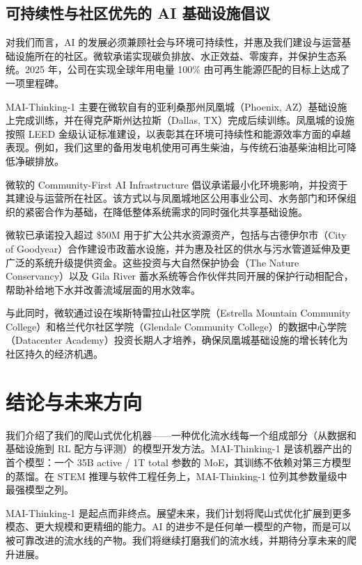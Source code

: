 \documentclass[
  10
]{article}
\begin{document}
\subsection{可持续性与社区优先的 AI 基础设施倡议}\label{sustainability-and-communityfirst-ai-infrastructure-initiatives}

对我们而言，AI 的发展必须兼顾社会与环境可持续性，并惠及我们建设与运营基础设施所在的社区。微软承诺实现碳负排放、水正效益、零废弃，并保护生态系统。2025 年，公司在实现全球年用电量 100\% 由可再生能源匹配的目标上达成了一项里程碑。

MAI-Thinking-1 主要在微软自有的亚利桑那州凤凰城（Phoenix, AZ）基础设施上完成训练，并在得克萨斯州达拉斯（Dallas, TX）完成后续训练。凤凰城的设施按照 LEED 金级认证标准建设，以表彰其在环境可持续性和能源效率方面的卓越表现。例如，我们这里的备用发电机使用可再生柴油，与传统石油基柴油相比可降低净碳排放。

微软的 Community-First AI Infrastructure 倡议承诺最小化环境影响，并投资于其建设与运营所在社区。该方式以与凤凰城地区公用事业公司、水务部门和环保组织的紧密合作为基础，在降低整体系统需求的同时强化共享基础设施。

微软已承诺投入超过 \$50M 用于扩大公共水资源资产，包括与古德伊尔市（City of Goodyear）合作建设市政蓄水设施，并为惠及社区的供水与污水管道延伸及更广泛的系统升级提供资金。这些投资与大自然保护协会（The Nature Conservancy）以及 Gila River 蓄水系统等合作伙伴共同开展的保护行动相配合，帮助补给地下水并改善流域层面的用水效率。

与此同时，微软通过设在埃斯特雷拉山社区学院（Estrella Mountain Community College）和格兰代尔社区学院（Glendale Community College）的数据中心学院（Datacenter Academy）投资长期人才培养，确保凤凰城基础设施的增长转化为社区持久的经济机遇。

\section{结论与未来方向}\label{conclusion-and-future-directions}

我们介绍了我们的爬山式优化机器——一种优化流水线每一个组成部分（从数据和基础设施到 RL 配方与评测）的模型开发方法。MAI-Thinking-1 是该机器产出的首个模型：一个 35B active / 1T total 参数的 MoE，其训练不依赖对第三方模型的蒸馏。在 STEM 推理与软件工程任务上，MAI-Thinking-1 位列其参数量级中最强模型之列。

MAI-Thinking-1 是起点而非终点。展望未来，我们计划将爬山式优化扩展到更多模态、更大规模和更精细的能力。AI 的进步不是任何单一模型的产物，而是可以被可靠改进的流水线的产物。我们将继续打磨我们的流水线，并期待分享未来的爬升进展。
\end{document}
